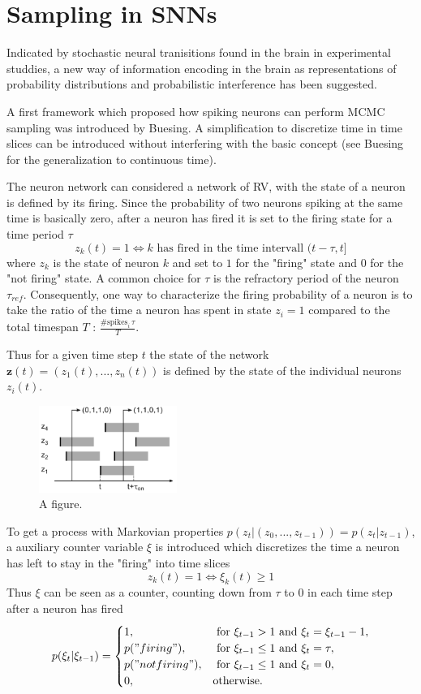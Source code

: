 \section{Sampling in SNNs}

Indicated by stochastic neural tranisitions found in the brain in experimental studdies, a new way of information encoding in the brain as representations of probability distributions and probabilistic interference has been suggested.


A first framework which proposed how spiking neurons can perform MCMC sampling was introduced by Buesing.
A simplification to discretize time in time slices can be introduced without interfering with the basic concept (see Buesing for the generalization to continuous time).

The neuron network can considered a network of RV, with the state of a neuron is defined by its firing. 
Since the probability of two neurons spiking at the same time is basically zero, after a neuron has fired it is set to the firing state for a time period $\tau$
\[
z_k(t) = 1 \iff k \text{ has fired in the time intervall } (t - \tau , t ] 
\] 
where $z_k$ is the state of neuron $k$ and set to $1$ for the "firing" state and $0$ for the "not firing" state. A common choice for $\tau$ is the refractory period of the neuron $\tau_{ref}$.
Consequently, one way to characterize the firing probability of a neuron is to take the ratio of the time a neuron has spent in state $z_i=1$ compared to the total timespan $T$ : $\frac{\#\text{spikes}_i \, \tau}{ T }$.

Thus for a given time step $t$ the state of the network $\textbf{z}(t) = (z_1(t), ... ,z_n(t))$ is defined by the state of the individual neurons $z_i(t)$. 


\begin{figure}
	\centering
    	\includegraphics[width=0.4\textwidth]{imgs/snn_sample1.png} 
    \caption{A figure.}
	\label{fig:test}
\end{figure}

To get a process with Markovian properties $p(z_t| (z_0, ..., z_{t-1})) = p(z_t| z_{t-1}) $, a auxiliary counter variable $\xi$ is introduced which discretizes the time a neuron has left to stay in the "firing" into time slices
\[
z_k(t) = 1 \iff \xi_k(t) \ge 1
\]
Thus $\xi$ can be seen as a counter, counting down from $\tau$ to $0$ in each time step after a neuron has fired
\[
p(\xi_t | \xi_{t-1}) = 
\begin{cases}
	1, & \text{ for } \xi_{t-1} > 1 \text{ and } \xi_t = \xi_{t-1} -1 ,\\
	p("firing"), & \text{ for } \xi_{t-1} \le 1 \text{ and } \xi_t = \tau ,\\
	p("not firing"), & \text{ for } \xi_{t-1} \le 1 \text{ and } \xi_t = 0 ,\\
	0, & \text{otherwise}.
\end{cases}
\]

